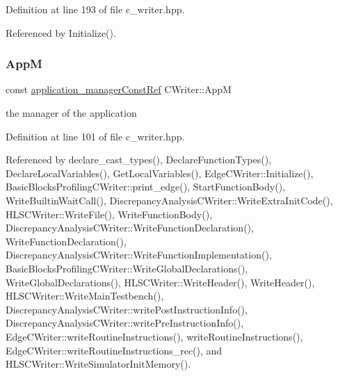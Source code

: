 Definition at line 193 of file c\+\_\+writer.\+hpp.



Referenced by Initialize().

\mbox{\label{classCWriter_ac1c04f158e0edaddd59a002dc11213fa}} 
\subsubsection{\texorpdfstring{AppM}{AppM}}
{\footnotesize\ttfamily const \hyperlink{application__manager_8hpp_abb985163a2a3fb747f6f03b1eaadbb44}{application\+\_\+manager\+Const\+Ref} C\+Writer\+::\+AppM\hspace{0.3cm}{\ttfamily [protected]}}



the manager of the application 



Definition at line 101 of file c\+\_\+writer.\+hpp.



Referenced by declare\+\_\+cast\+\_\+types(), Declare\+Function\+Types(), Declare\+Local\+Variables(), Get\+Local\+Variables(), Edge\+C\+Writer\+::\+Initialize(), Basic\+Blocks\+Profiling\+C\+Writer\+::print\+\_\+edge(), Start\+Function\+Body(), Write\+Builtin\+Wait\+Call(), Discrepancy\+Analysis\+C\+Writer\+::\+Write\+Extra\+Init\+Code(), H\+L\+S\+C\+Writer\+::\+Write\+File(), Write\+Function\+Body(), Discrepancy\+Analysis\+C\+Writer\+::\+Write\+Function\+Declaration(), Write\+Function\+Declaration(), Discrepancy\+Analysis\+C\+Writer\+::\+Write\+Function\+Implementation(), Basic\+Blocks\+Profiling\+C\+Writer\+::\+Write\+Global\+Declarations(), Write\+Global\+Declarations(), H\+L\+S\+C\+Writer\+::\+Write\+Header(), Write\+Header(), H\+L\+S\+C\+Writer\+::\+Write\+Main\+Testbench(), Discrepancy\+Analysis\+C\+Writer\+::write\+Post\+Instruction\+Info(), Discrepancy\+Analysis\+C\+Writer\+::write\+Pre\+Instruction\+Info(), Edge\+C\+Writer\+::write\+Routine\+Instructions(), write\+Routine\+Instructions(), Edge\+C\+Writer\+::write\+Routine\+Instructions\+\_\+rec(), and H\+L\+S\+C\+Writer\+::\+Write\+Simulator\+Init\+Memory().

\mbox{\label{classCWriter_a5c31c88bdb91ff32a3f0a277134af908}} 
